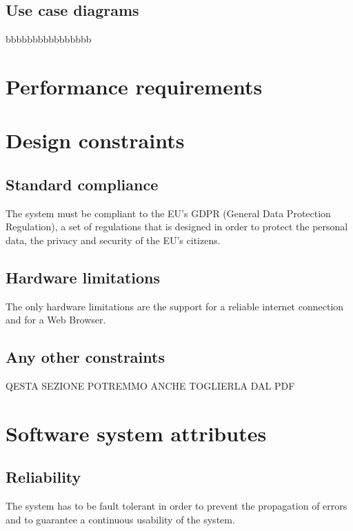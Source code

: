 \subsection{Use case diagrams}
\label{subsec:use_case_diagrams}%
bbbbbbbbbbbbbbbb

\section{Performance requirements}
\label{sec:performance_requirements}%


\section{Design constraints}
\label{sec:design_constraints}%

\subsection{Standard compliance}
\label{subsec:standard compliance}%
The system must be compliant to the EU's GDPR (General Data Protection Regulation), a set of regulations that is designed in order to protect the personal data, the privacy and security of the EU's citizens. 

\subsection{Hardware limitations}
\label{subsec:hardware_limitations}%
The only hardware limitations are the support for a reliable internet connection and for a Web Browser.

\subsection{Any other constraints}
\label{subsec:other_constraints}%
QESTA SEZIONE POTREMMO ANCHE TOGLIERLA DAL PDF


\section{Software system attributes}
\label{sec:software_system_attributes}%

\subsection{Reliability}
\label{subsec:reliability}%
The system has to be fault tolerant in order to prevent the propagation of errors and to guarantee a continuous usability of the system.


